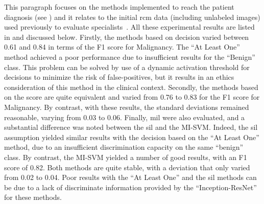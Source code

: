 \documentclass[journal,article,accept,moreauthors,pdftex, applsci]{Definitions/mdpi}
\begin{document}
This paragraph focuses on the methods implemented to reach the patient diagnosis (see ) and it relates to the initial \ac{rcm} data (including unlabeled images) used previously to evaluate specialists~\cite{Cinotti2018}. All these experimental results are listed in  and discussed below. Firstly, the methods based on decision varied between 0.61 and 0.84 in terms of the F1 score for Malignancy. The “At Least One” method achieved a poor performance due to insufficient results for the “Benign” class. This problem can be solved by use of a dynamic activation threshold for decisions to minimize the risk of false-positives, but it results in an ethics consideration of this method in the clinical context. Secondly, the methods based on the score are quite equivalent and varied from 0.76 to 0.83 for the F1 score for Malignancy. By contrast, with these results, the standard deviations remained reasonable, varying from 0.03 to 0.06. Finally, \ac{mil} were also evaluated, and a substantial difference was noted between the \ac{sil} and the MI-SVM. Indeed, the \ac{sil} assumption yielded similar results with the decision based on the “At Least One” method, due to an insufficient discrimination capacity on the same “benign” class. By contrast, the MI-SVM yielded a number of good results, with an F1 score of 0.82. Both methods are quite stable, with a deviation that only varied from 0.02 to 0.04. Poor results with the “At Least One” and the \ac{sil} methods can be due to a lack of discriminate information provided by the “Inception-ResNet” for these methods.\par
\end{document}
